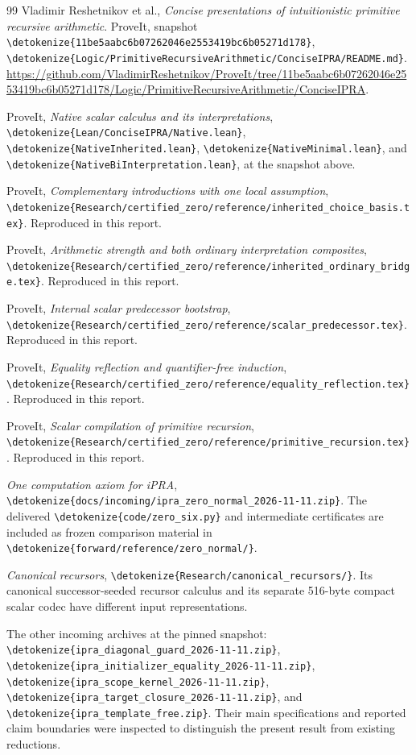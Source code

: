 \documentclass[11pt,letterpaper]{article}
\theoremstyle{definition}
\theoremstyle{remark}
\newcommand{\file}[1]{\expandafter\nolinkurl\expandafter{\detokenize{#1}}}
\begin{document}
\clearpage
\begin{thebibliography}{99}
Vladimir Reshetnikov et al.,
\emph{Concise presentations of intuitionistic primitive recursive arithmetic}.
ProveIt, snapshot
\file{11be5aabc6b07262046e2553419bc6b05271d178},
\file{Logic/PrimitiveRecursiveArithmetic/ConciseIPRA/README.md}.
\url{https://github.com/VladimirReshetnikov/ProveIt/tree/11be5aabc6b07262046e2553419bc6b05271d178/Logic/PrimitiveRecursiveArithmetic/ConciseIPRA}.

ProveIt, \emph{Native scalar calculus and its interpretations},
\file{Lean/ConciseIPRA/Native.lean},
\file{NativeInherited.lean}, \file{NativeMinimal.lean},
and \file{NativeBiInterpretation.lean}, at the snapshot above.

ProveIt, \emph{Complementary introductions with one local assumption},
\file{Research/certified_zero/reference/inherited_choice_basis.tex}.
Reproduced in this report.

ProveIt, \emph{Arithmetic strength and both ordinary interpretation composites},
\file{Research/certified_zero/reference/inherited_ordinary_bridge.tex}.
Reproduced in this report.

ProveIt, \emph{Internal scalar predecessor bootstrap},
\file{Research/certified_zero/reference/scalar_predecessor.tex}.
Reproduced in this report.

ProveIt, \emph{Equality reflection and quantifier-free induction},
\file{Research/certified_zero/reference/equality_reflection.tex}.
Reproduced in this report.

ProveIt, \emph{Scalar compilation of primitive recursion},
\file{Research/certified_zero/reference/primitive_recursion.tex}.
Reproduced in this report.

\emph{One computation axiom for iPRA},
\file{docs/incoming/ipra_zero_normal_2026-11-11.zip}.
The delivered \file{code/zero_six.py} and intermediate certificates are
included as frozen comparison material in \file{forward/reference/zero_normal/}.

\emph{Canonical recursors},
\file{Research/canonical_recursors/}.
Its canonical successor-seeded recursor calculus and its separate 516-byte
compact scalar codec have different input representations.

The other incoming archives at the pinned snapshot:
\file{ipra_diagonal_guard_2026-11-11.zip},
\file{ipra_initializer_equality_2026-11-11.zip},
\file{ipra_scope_kernel_2026-11-11.zip},
\file{ipra_target_closure_2026-11-11.zip}, and
\file{ipra_template_free.zip}.
Their main specifications and reported claim boundaries were inspected
to distinguish the present result from existing reductions.
\end{thebibliography}
\end{document}
